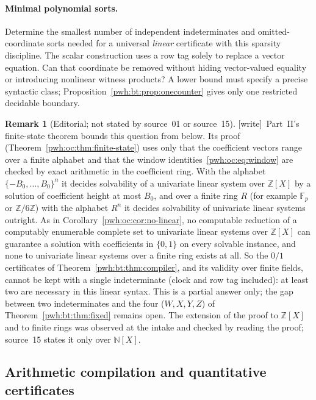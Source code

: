 \documentclass[11pt,letterpaper]{article}
\numberwithin{equation}{section}
\theoremstyle{definition}
\newtheorem{remark}[theorem]{Remark}
\newcommand{\N}{\mathbb N}
\newcommand{\Z}{\mathbb Z}
\newcommand{\Fbb}{\mathbb F}
\newcommand{\wtag}{\textup{[write]}}
\begin{document}
\paragraph{Minimal polynomial sorts.}
Determine the smallest number of independent indeterminates and
omitted-coordinate sorts needed for a universal \emph{linear}
certificate with this sparsity discipline. The scalar construction
uses a row tag solely to replace a vector equation. Can that coordinate
be removed without hiding vector-valued equality or introducing
nonlinear witness products? A lower bound must specify a precise
syntactic class; Proposition~\ref{pwh:bt:prop:onecounter} gives only one
restricted decidable boundary.

\begin{remark}[Editorial; not stated by source~01 or source~15]\label{pwh:bt:rem:univariate}
\wtag\ Part~II's finite-state theorem bounds this question from below. Its
proof (Theorem~\ref{pwh:oc:thm:finite-state}) uses only that the
coefficient vectors range over a finite alphabet and that the window
identities~\eqref{pwh:oc:eq:window} are checked by exact arithmetic in the
coefficient ring. With the alphabet $\{-B_0,\ldots,B_0\}^n$ it decides
solvability of a univariate linear system over $\Z[X]$ by a solution of
coefficient height at most $B_0$, and over a finite ring $R$ (for example
$\Fbb_p$ or $\Z/6\Z$) with the alphabet $R^n$ it decides solvability of
univariate linear systems outright. As in
Corollary~\ref{pwh:oc:cor:no-linear}, no computable reduction of a
computably enumerable complete set to univariate linear systems over
$\Z[X]$ can guarantee a solution with coefficients in $\{0,1\}$ on every
solvable instance, and none to univariate linear systems over a finite
ring exists at all. So the $0/1$ certificates of
Theorem~\ref{pwh:bt:thm:compiler}, and its validity over finite fields,
cannot be kept with a single indeterminate (clock and row tag included):
at least two are necessary in this linear syntax. This is a partial answer
only; the gap between two indeterminates and the four ($W,X,Y,Z$) of
Theorem~\ref{pwh:bt:thm:fixed} remains open. The extension of the proof to
$\Z[X]$ and to finite rings was observed at the intake and checked by
reading the proof; source~15 states it only over $\N[X]$.
\end{remark}

\subsection{Arithmetic compilation and quantitative certificates}\label{pwh:bt:q:arithmetic}
\end{document}
